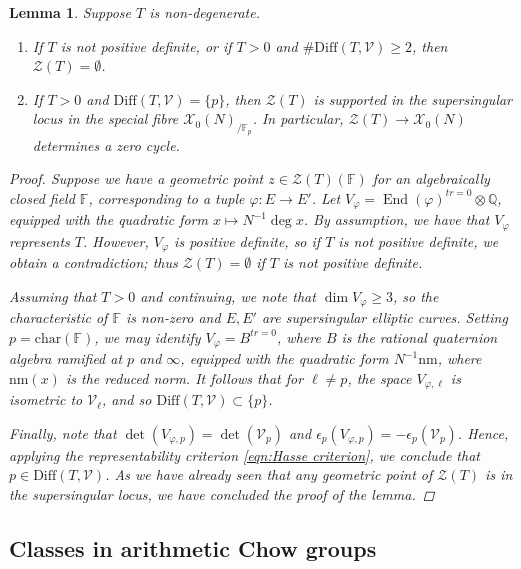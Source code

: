 \documentclass[reqno,oneside]{amsart}
\theoremstyle{plain}
\newtheorem{lemma}[theorem]{Lemma}
\theoremstyle{remark}
\numberwithin{theorem}{section}
\newcommand{\bbF}{\mathbb F}
\newcommand{\bbQ}{\mathbb Q}
\newcommand{\calV}{\mathcal V}
\newcommand{\calX}{\mathcal X}
\newcommand{\calZ}{\mathcal Z}
\newcommand{\nm}{\mathrm{nm}}
\DeclareMathOperator{\End}{End}
\begin{document}
	
	\begin{lemma} \label{lemma:support of Z(T)}
		Suppose $T$ is non-degenerate.
		\begin{enumerate}
			\item 	If $T$ is not positive definite, or if $T>0$ and $\# \mathrm{Diff}(T,\calV) \geq 2$, then $\calZ(T) = \emptyset$.
			\item If $T >0$ and $\mathrm{Diff}(T,\calV) = \{ p \}$, then $\calZ(T)$ is supported in the supersingular locus in the special fibre $\calX_0(N)_{/ \bbF_{p}}$. In particular, $\calZ(T) \to \calX_0(N)$ determines a zero cycle.
		\end{enumerate}
		\begin{proof}
			Suppose we have a geometric point $z \in \calZ(T)(\bbF)$ for an algebraically closed field $\bbF$, corresponding to a tuple $\varphi \colon E \to E'$. Let $V_{\varphi} = \End(\varphi)^{tr= 0} \otimes \bbQ$,  equipped with the quadratic form $x \mapsto N^{-1} \deg x$. By assumption, we have that $V_{\varphi}$ represents $T$. However, $V_{\varphi}$ is positive definite, so if $T$ is not positive definite, we obtain a contradiction; thus $\calZ(T) = \emptyset$ if $T$ is not positive definite.
			
			Assuming that $T>0$ and continuing, we note that $\dim V_{\varphi} \geq 3$, so the characteristic of $\bbF$ is non-zero and $E, E'$ are supersingular elliptic curves. Setting $p = \mathrm{char}(\mathbb F)$, we may identify $V_{\varphi} = B^{tr = 0}$, where $B$ is the rational quaternion algebra ramified at $p$ and $\infty$, equipped with the quadratic form $N^{-1} \nm$, where $\nm(x)$ is the reduced norm. It follows that for $\ell \neq p$, the space $V_{\varphi,\ell}$ is isometric to $ \calV_{\ell} $, and so $\mathrm{Diff}(T, \calV) \subset \{ p \}$.
			
			Finally, note that $\det(V_{\varphi,p})= \det(\calV_p)$ and  $\epsilon_p(V_{\varphi,p}) = - \epsilon_p(\calV_p)$. Hence, applying the representability criterion \eqref{eqn:Hasse criterion}, we conclude that $p \in \mathrm{Diff}(T,\calV)$. As we have already seen that any geometric point of $\calZ(T)$ is in the supersingular locus, we have concluded the proof of the lemma.
		\end{proof}
	\end{lemma}
	
	\subsection{Classes in arithmetic Chow groups} \label{sec:arith Ch gps}
	
\end{document}
